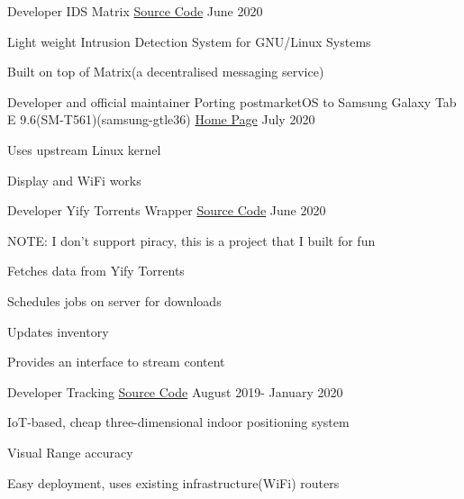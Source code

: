 \begin{cventries}
  \cventry
    {Developer}
    {IDS Matrix}
    {\href{https://github.com/realaravinth/ids-matrix}{Source Code}}
    {June 2020}
    {
        \begin{cvitems} %
        \item {Light weight Intrusion Detection System for GNU/Linux Systems}
        \item {Built on top of Matrix(a decentralised messaging service)}
      \end{cvitems}
    }
    
    \cventry
    {Developer and official maintainer}
    {Porting postmarketOS to Samsung Galaxy Tab E 9.6(SM-T561)(samsung-gtle36)}
    {\href{https://wiki.postmarketos.org/wiki/Samsung_Galaxy_Tab_E_9.6_(SM-T561)_(samsung-gtel3g)}{Home Page}}
    {July 2020}
    {
        \begin{cvitems} %
            \item {Uses upstream Linux kernel}
            \item {Display and WiFi works}
        \end{cvitems}
    }
    
    \cventry
    {Developer}
    {Yify Torrents Wrapper}
    {\href{https://github.com/realaravinth/yts-wrapper}{Source Code}}
    {June 2020}
    {
        \begin{cvitems} %
            \item{NOTE: I don't support piracy, this is a project that I built for fun}
            \item {Fetches data from Yify Torrents}
            \item {Schedules jobs on server for downloads}
            \item {Updates inventory}
            \item {Provides an interface to stream content}
        \end{cvitems}
    }
    
    \cventry
    {Developer}
    {Tracking}
    {\href{https://github.com/realaravinth/tracking}{Source Code}}
    {August 2019- January 2020}
    {
        \begin{cvitems} %
        \item {IoT-based, cheap three-dimensional indoor positioning system}
        \item {Visual Range accuracy}
        \item {Easy deployment, uses existing infrastructure(WiFi) routers}
      \end{cvitems}
    }
    
  
\end{cventries}